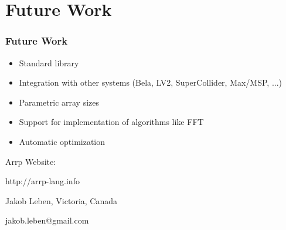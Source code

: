 \documentclass{beamer}
\begin{document}
\section{Future Work}

\begin{frame}[fragile]
\frametitle{Future Work}

\begin{itemize}
\item Standard library
\item Integration with other systems (Bela, LV2, SuperCollider, Max/MSP, ...)
\item Parametric array sizes
\item Support for implementation of algorithms like FFT
\item Automatic optimization
\end{itemize}

\end{frame}

\begin{frame}[fragile]

\centering

\vspace{15pt}

Arrp Website:

http://arrp-lang.info

\vspace{30pt}

Jakob Leben, Victoria, Canada

jakob.leben@gmail.com

\end{frame}
\end{document}
